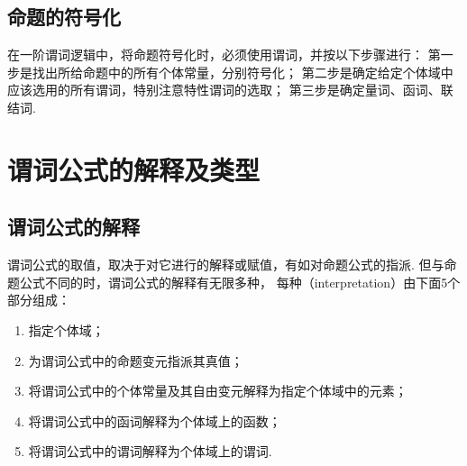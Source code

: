 \subsection{命题的符号化}
在一阶谓词逻辑中，将命题符号化时，必须使用谓词，并按以下步骤进行：
第一步是找出所给命题中的所有个体常量，分别符号化；
第二步是确定给定个体域中应该选用的所有谓词，特别注意特性谓词的选取；
第三步是确定量词、函词、联结词.


\section{谓词公式的解释及类型}
\subsection{谓词公式的解释}
谓词公式的取值，取决于对它进行的解释或赋值，有如对命题公式的指派.
但与命题公式不同的时，谓词公式的解释有无限多种，
每种（interpretation）由下面5个部分组成：\begin{enumerate}
	\item 指定个体域；
	\item 为谓词公式中的命题变元指派其真值；
	\item 将谓词公式中的个体常量及其自由变元解释为指定个体域中的元素；
	\item 将谓词公式中的函词解释为个体域上的函数；
	\item 将谓词公式中的谓词解释为个体域上的谓词.
\end{enumerate}


